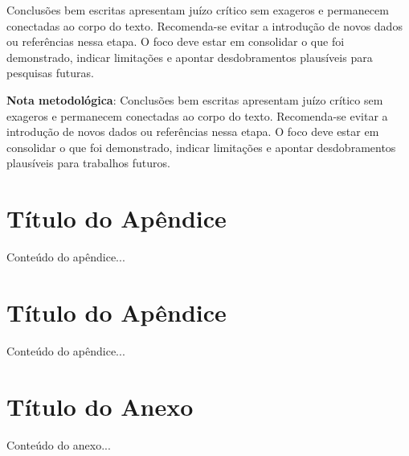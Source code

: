 \documentclass{eic-bcc-tcc}
\begin{document}
Conclusões bem escritas apresentam juízo crítico sem exageros e permanecem conectadas ao corpo do texto. Recomenda-se evitar a introdução de novos dados ou referências nessa etapa. O foco deve estar em consolidar o que foi demonstrado, indicar limitações e apontar desdobramentos plausíveis para pesquisas futuras.

\textbf{Nota metodológica}: Conclusões bem escritas apresentam juízo crítico sem exageros e permanecem conectadas ao corpo do texto. Recomenda-se evitar a introdução de novos dados ou referências nessa etapa. O foco deve estar em consolidar o que foi demonstrado, indicar limitações e apontar desdobramentos plausíveis para trabalhos futuros.




\backmatter


\appendix
\chapter{Título do Apêndice}
Conteúdo do apêndice...

\chapter{Título do Apêndice}
Conteúdo do apêndice...

\anexos
\chapter{Título do Anexo}
Conteúdo do anexo...
\end{document}
